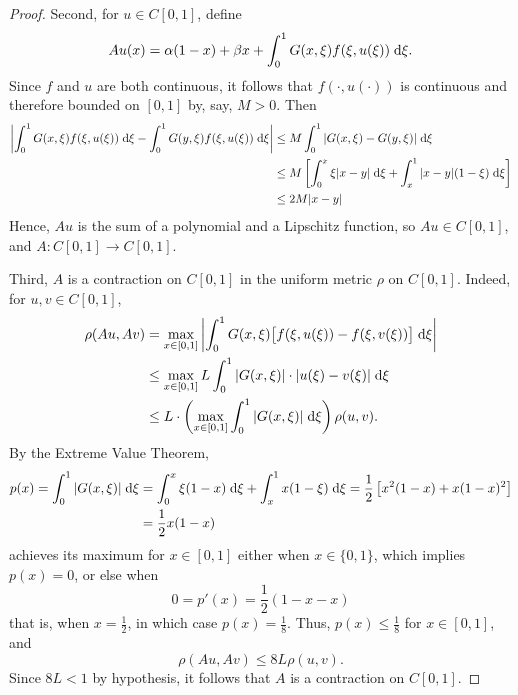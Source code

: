 \documentclass{homework}
\begin{document}
\begin{enumerate}[label=\textbf{(\roman*)}]
\begin{proof}
			Second, for $u\in C[0,1]$, define
			\begin{equation}
				Au(x) = \alpha(1-x) + \beta x + \int_0^1G(x,\xi)f(\xi, u(\xi))\;\text{d}\xi.
			\end{equation}
			Since $f$ and $u$ are both continuous, it follows that $f(\cdot, u(\cdot))$ is continuous and therefore bounded on $[0,1]$ by, say, $M > 0$. Then
			\begin{align*}
				\left|\int_0^1 G(x,\xi)f(\xi, u(\xi))\;\text{d}\xi - \int_0^1G(y,\xi)f(\xi,u(\xi))\;\text{d}\xi\right| &\le M \int_0^1|G(x,\xi) - G(y,\xi)|\;\text{d}\xi \\
				&\le M\left[\int_0^x  \xi|x-y|\;\text{d}\xi + \int_x^1 |x-y|(1-\xi)\;\text{d}\xi\right] \\
				&\le 2M |x-y|
			\end{align*}
			Hence, $Au$ is the sum of a polynomial and a Lipschitz function, so $Au \in C[0,1]$, and $A : C[0,1] \to C[0,1]$.
			
			Third, $A$ is a contraction on $C[0,1]$ in the uniform metric $\rho$ on $C[0,1]$. Indeed, for $u, v \in C[0,1]$,
			\begin{align}
				\rho(Au,Av) &= \max_{x\in[0,1]}\left|\int_0^1G(x,\xi)\big[f(\xi, u(\xi))-f(\xi,v(\xi))\big]\;\text{d}\xi\right| \\
				&\le \max_{x\in[0,1]} L\int_0^1|G(x,\xi)| \cdot|u(\xi) - v(\xi)|\;\text{d}\xi \\
				&\le L \cdot\left(\max_{x\in[0,1]}\int_0^1 |G(x,\xi)|\;\text{d}\xi\right)\rho(u,v).
			\end{align}
			By the Extreme Value Theorem,
			\begin{equation}
				\begin{aligned}
					p(x) = \int_0^1|G(x,\xi)|\;\text{d}\xi &= \int_0^x \xi(1-x)\;\text{d}\xi + \int_x^1x(1-\xi)\;\text{d}\xi = \frac{1}{2}\left[x^2(1-x) + x(1-x)^2\right] \\
					&= \frac{1}{2}x(1-x)
				\end{aligned}
			\end{equation}
			achieves its maximum for $x \in [0,1]$ either when $x \in \{0,1\}$, which implies $p(x) = 0$, or else when 
			\begin{equation}
				0 = p'(x) = \frac{1}{2}(1-x - x)
			\end{equation}
			that is, when $x = \frac{1}{2}$, in which case $p(x) = \frac{1}{8}$. Thus, $p(x) \le \frac{1}{8}$ for $x \in [0,1]$, and
			\begin{equation}
				\rho(Au,Av) \le 8L \rho(u,v).
			\end{equation}
			Since $8L < 1$ by hypothesis, it follows that $A$ is a contraction on $C[0,1]$.
			

\end{proof}
\end{enumerate}
\end{document}
